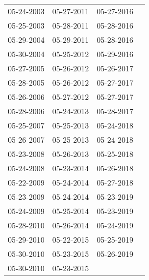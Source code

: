\begin{supertabular}{llll}
 05-24-2003 &  05-27-2011 &  05-27-2016 \\
 05-25-2003 &  05-28-2011 &  05-28-2016 \\
 05-29-2004 &  05-29-2011 &  05-28-2016 \\
 05-30-2004 &  05-25-2012 &  05-29-2016 \\
 05-27-2005 &  05-26-2012 &  05-26-2017 \\
 05-28-2005 &  05-26-2012 &  05-27-2017 \\
 05-26-2006 &  05-27-2012 &  05-27-2017 \\
 05-28-2006 &  05-24-2013 &  05-28-2017 \\
 05-25-2007 &  05-25-2013 &  05-24-2018 \\
 05-26-2007 &  05-25-2013 &  05-24-2018 \\
 05-23-2008 &  05-26-2013 &  05-25-2018 \\
 05-24-2008 &  05-23-2014 &  05-26-2018 \\
 05-22-2009 &  05-24-2014 &  05-27-2018 \\
 05-23-2009 &  05-24-2014 &  05-23-2019 \\
 05-24-2009 &  05-25-2014 &  05-23-2019 \\
 05-28-2010 &  05-26-2014 &  05-24-2019 \\
 05-29-2010 &  05-22-2015 &  05-25-2019 \\
 05-30-2010 &  05-23-2015 &  05-26-2019 \\
 05-30-2010 &  05-23-2015 &             \\
\end{supertabular}
